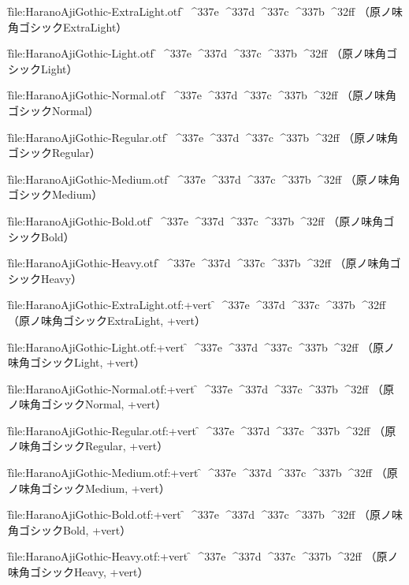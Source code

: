 

\nopagenumbers

\font\f{file:HaranoAjiGothic-ExtraLight.otf} \f
^^^^337e
^^^^337d
^^^^337c
^^^^337b
^^^^32ff
（原ノ味角ゴシックExtraLight）\par

\font\f{file:HaranoAjiGothic-Light.otf} \f
^^^^337e
^^^^337d
^^^^337c
^^^^337b
^^^^32ff
（原ノ味角ゴシックLight）\par

\font\f{file:HaranoAjiGothic-Normal.otf} \f
^^^^337e
^^^^337d
^^^^337c
^^^^337b
^^^^32ff
（原ノ味角ゴシックNormal）\par

\font\f{file:HaranoAjiGothic-Regular.otf} \f
^^^^337e
^^^^337d
^^^^337c
^^^^337b
^^^^32ff
（原ノ味角ゴシックRegular）\par

\font\f{file:HaranoAjiGothic-Medium.otf} \f
^^^^337e
^^^^337d
^^^^337c
^^^^337b
^^^^32ff
（原ノ味角ゴシックMedium）\par

\font\f{file:HaranoAjiGothic-Bold.otf} \f
^^^^337e
^^^^337d
^^^^337c
^^^^337b
^^^^32ff
（原ノ味角ゴシックBold）\par

\font\f{file:HaranoAjiGothic-Heavy.otf} \f
^^^^337e
^^^^337d
^^^^337c
^^^^337b
^^^^32ff
（原ノ味角ゴシックHeavy）\par


\font\f{file:HaranoAjiGothic-ExtraLight.otf:+vert} \f
^^^^337e
^^^^337d
^^^^337c
^^^^337b
^^^^32ff
（原ノ味角ゴシックExtraLight, +vert）\par

\font\f{file:HaranoAjiGothic-Light.otf:+vert} \f
^^^^337e
^^^^337d
^^^^337c
^^^^337b
^^^^32ff
（原ノ味角ゴシックLight, +vert）\par

\font\f{file:HaranoAjiGothic-Normal.otf:+vert} \f
^^^^337e
^^^^337d
^^^^337c
^^^^337b
^^^^32ff
（原ノ味角ゴシックNormal, +vert）\par

\font\f{file:HaranoAjiGothic-Regular.otf:+vert} \f
^^^^337e
^^^^337d
^^^^337c
^^^^337b
^^^^32ff
（原ノ味角ゴシックRegular, +vert）\par

\font\f{file:HaranoAjiGothic-Medium.otf:+vert} \f
^^^^337e
^^^^337d
^^^^337c
^^^^337b
^^^^32ff
（原ノ味角ゴシックMedium, +vert）\par

\font\f{file:HaranoAjiGothic-Bold.otf:+vert} \f
^^^^337e
^^^^337d
^^^^337c
^^^^337b
^^^^32ff
（原ノ味角ゴシックBold, +vert）\par

\font\f{file:HaranoAjiGothic-Heavy.otf:+vert} \f
^^^^337e
^^^^337d
^^^^337c
^^^^337b
^^^^32ff
（原ノ味角ゴシックHeavy, +vert）\par

\bye
